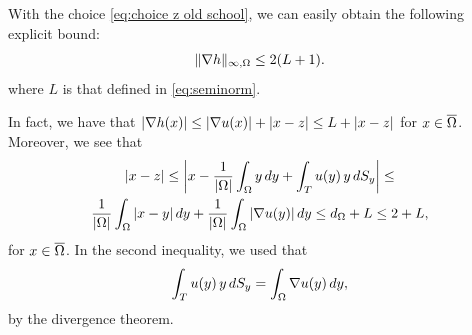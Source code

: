 \documentclass[a4paper,10pt]{amsart}
\numberwithin{equation}{section}
\begin{document}
\begin{rem}
\label{rem:bound-grad-h}
	{\rm
	With the choice \eqref{eq:choice z old school}, we can easily obtain the following explicit bound:
\begin{equation*}
	\Vert \nabla h \Vert_{\infty, \Omega} \le 2(L+1).
\end{equation*}
where $L$ is that defined in \eqref{eq:seminorm}.
\par
In fact, we have that $|\nabla h(x)|\le |\nabla u(x)|+|x-z|\le L+|x-z|$ for $x\in\overline{\Omega}$. Moreover, we see that
\begin{multline*}
|x-z|\le\left|x-\frac1{|\Omega|}\int_\Omega y\,dy+\int_T u(y)\,y\,dS_y\right| \le \\
\frac1{|\Omega|}\int_\Omega |x-y|\,dy+\frac1{|\Omega|}\int_\Omega |\nabla u(y)|\,dy \le
d_\Omega+L\le 2+L,
\end{multline*}
for $x\in\overline{\Omega}$. In the second inequality, we used that
$$
\int_T u(y)\,y\,dS_y=\int_\Omega \nabla u(y)\,dy,
$$
by the divergence theorem.

}
\end{rem}
\end{document}
